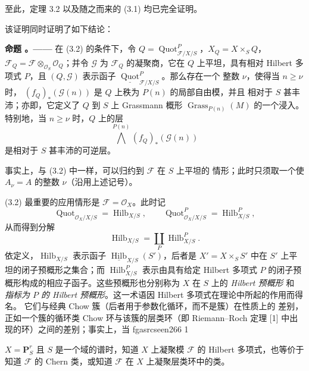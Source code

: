\documentclass[12pt,twoside,openany]{book}
\numberwithin{equation}{section}
\newcommand{\fgaunitid}{unbound}
\newcommand{\src}[1]{%
  \phantomsection
  \hypertarget{src:\fgaunitid:#1}{}%
  \hypertarget{fga.\fgaunitid.p#1}{}%
  \ifcsname fgasrcseen#1\endcsname\else
    \expandafter\gdef\csname fgasrcseen#1\endcsname{1}%
    \hypertarget{src:#1}{}%
  \fi
  \marginpar{\raggedleft\footnotesize\sffamily #1}%
}
\theoremstyle{plain}
\theoremstyle{definition}
\theoremstyle{remark}
\newcommand{\result}[2]{%
  \par\medskip\noindent\textbf{#1%
  \if\relax\detokenize{#2}\relax\else\space#2\fi。——}\enspace
}
\begin{document}
至此，定理 3.2 以及随之而来的 (3.1) 均已完全证明。

该证明同时证明了如下结论：

\result{命题}{3.8} 在 (3.2) 的条件下，令
$Q=\operatorname{Quot}^P_{\mathcal F/X/S}$，$X_Q=X\times_SQ$，
$\mathcal F_Q=\mathcal F\otimes_{\mathcal O_S}\mathcal O_Q$；并令
$\mathcal G$ 为 $\mathcal F_Q$ 的凝聚商，它在 $Q$ 上平坦，具有相对
Hilbert 多项式 $P$，且 $(Q,\mathcal G)$ 表示函子
$\underline{\operatorname{Quot}}^P_{\mathcal F/X/S}$。那么存在一个
整数 $\nu$，使得当 $n\geq\nu$ 时，
$(f_Q)_*(\mathcal G(n))$ 是 $Q$ 上秩为 $P(n)$ 的局部自由模，并且
相对于 $S$ 甚丰沛；亦即，它定义了 $Q$ 到 $S$ 上 Grassmann 概形
$\operatorname{Grass}_{P(n)}(M)$ 的一个浸入。特别地，当
$n\geq\nu$ 时，$Q$ 上的层
\[
\bigwedge^{P(n)}(f_Q)_*(\mathcal G(n))
\]
是相对于 $S$ 甚丰沛的可逆层。

事实上，与 (3.2) 中一样，可以归约到 $\mathcal F$ 在 $S$ 上平坦的
情形；此时只须取一个使 $A_\nu=A$ 的整数 $\nu$（沿用上述记号）。

(3.2) 最重要的应用情形是 $\mathcal F=\mathcal O_X$。此时记
\[
\operatorname{Quot}_{\mathcal O_X/X/S}=\operatorname{Hilb}_{X/S},
\qquad
\operatorname{Quot}^P_{\mathcal O_X/X/S}=\operatorname{Hilb}^P_{X/S},
\]
从而得到分解
\[
\operatorname{Hilb}_{X/S}=\coprod_P\operatorname{Hilb}^P_{X/S}.
\]
依定义，$\operatorname{Hilb}_{X/S}$ 表示函子
$\underline{\operatorname{Hilb}}_{X/S}(S')$，后者是
$X'=X\times_SS'$ 中在 $S'$ 上平坦的闭子预概形之集合；而
$\operatorname{Hilb}^P_{X/S}$ 表示由具有给定 Hilbert 多项式 $P$
的闭子预概形构成的相应子函子。这些预概形也分别称为 $X$ 在 $S$
上的 \emph{Hilbert 预概形} 和 \emph{指标为 $P$ 的 Hilbert
预概形}。这一术语因 Hilbert 多项式在理论中所起的作用而得名。
它们与经典 Chow 簇（后者用于参数化循环，而不是簇）在性质上的
差别，正如一个簇的循环类 Chow 环与该簇的层类环（即
Riemann--Roch 定理 [1] 中出现的环）之间的差别；事实上，当
\src{266}
$X=\mathbf P^r_S$ 且 $S$ 是一个域的谱时，知道 $X$ 上凝聚模
$\mathcal F$ 的 Hilbert 多项式，也等价于知道 $\mathcal F$ 的
Chern 类，或知道 $\mathcal F$ 在 $X$ 上凝聚层类环中的类。
\end{document}

